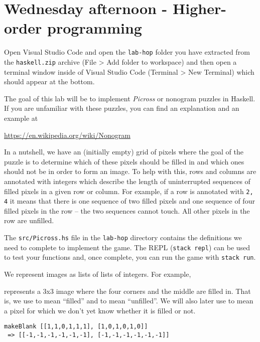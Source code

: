 \section{Wednesday afternoon - Higher-order programming}

Open Visual Studio Code and open the \texttt{\small lab-hop} folder you have extracted from the \texttt{haskell.zip} archive (File > Add folder to workspace) and then open a terminal window inside of Visual Studio Code (Terminal > New Terminal) which should appear at the bottom. 

The goal of this lab will be to implement \emph{Picross} or nonogram puzzles in Haskell. If you are unfamiliar with these puzzles, you can find an explanation and an example at
\begin{center}
    \url{https://en.wikipedia.org/wiki/Nonogram}
\end{center}
In a nutshell, we have an (initially empty) grid of pixels where the goal of the puzzle is to determine which of these pixels should be filled in and which ones should not be in order to form an image. To help with this, rows and columns are annotated with integers which describe the length of uninterrupted sequences of filled pixels in a given row or column. For example, if a row is annotated with \texttt{\small 2, 4} it means that there is one sequence of two filled pixels and one sequence of four filled pixels in the row -- the two sequences cannot touch. All other pixels in the row are unfilled.

The \texttt{\small src/Picross.hs} file in the \texttt{\small lab-hop} directory contains the definitions we need to complete to implement the game. The REPL (\texttt{\small stack repl}) can be used to test your functions and, once complete, you can run the game with \texttt{\small stack run}.

\taskLine

We represent images as lists of lists of integers. For example, 
\begin{center}
    \haskellIn{[[1,0,1], [0,1,0], [1,0,1]]} 
\end{center}
represents a 3x3 image where the four corners and the middle are filled in. That is, we use  to mean ``filled'' and  to mean ``unfilled''. We will also later use  to mean a pixel for which we don't yet know whether it is filled or not.

\begin{verbatim}
makeBlank [[1,1,0,1,1,1], [1,0,1,0,1,0]]
 => [[-1,-1,-1,-1,-1,-1], [-1,-1,-1,-1,-1,-1]]
\end{verbatim}

